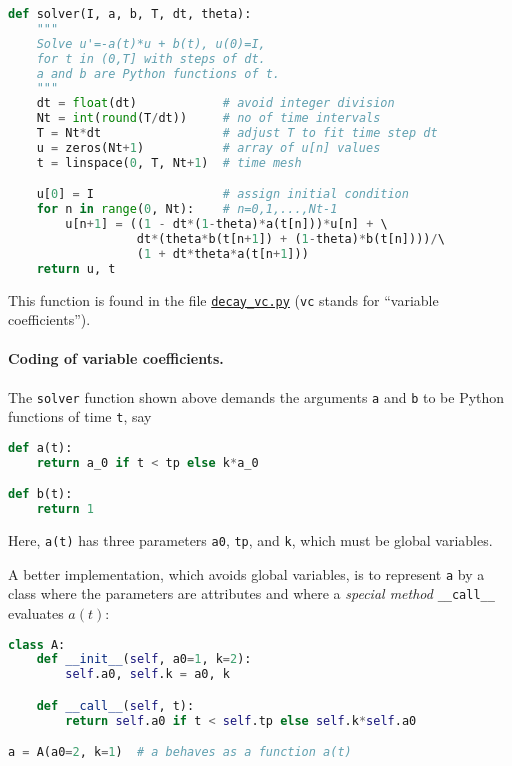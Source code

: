 \documentclass[graybox,sectrefs,envcountresetchap,open=right,final]{svmonodo}
\begin{document}
\begin{lstlisting}[language=Python,style=blue1_bluegreen]
def solver(I, a, b, T, dt, theta):
    """
    Solve u'=-a(t)*u + b(t), u(0)=I,
    for t in (0,T] with steps of dt.
    a and b are Python functions of t.
    """
    dt = float(dt)            # avoid integer division
    Nt = int(round(T/dt))     # no of time intervals
    T = Nt*dt                 # adjust T to fit time step dt
    u = zeros(Nt+1)           # array of u[n] values
    t = linspace(0, T, Nt+1)  # time mesh

    u[0] = I                  # assign initial condition
    for n in range(0, Nt):    # n=0,1,...,Nt-1
        u[n+1] = ((1 - dt*(1-theta)*a(t[n]))*u[n] + \ 
                  dt*(theta*b(t[n+1]) + (1-theta)*b(t[n])))/\ 
                  (1 + dt*theta*a(t[n+1]))
    return u, t
\end{lstlisting}
This function is found in the file \href{{http://tinyurl.com/ofkw6kc/genz/decay_vc.py}}{\nolinkurl{decay_vc.py}} (\texttt{vc} stands for ``variable coefficients'').

\paragraph{Coding of variable coefficients.}
The \texttt{solver} function shown above demands the arguments \texttt{a} and \texttt{b} to
be Python functions of time \texttt{t}, say

\begin{lstlisting}[language=Python,style=blue1_bluegreen]
def a(t):
    return a_0 if t < tp else k*a_0

def b(t):
    return 1
\end{lstlisting}
Here, \texttt{a(t)} has three parameters \texttt{a0}, \texttt{tp}, and \texttt{k},
which must be global variables.

A better implementation, which avoids global variables,
is to represent \texttt{a} by a class where the
parameters are attributes and where a \emph{special method} \Verb!__call__!
evaluates $a(t)$:

\begin{lstlisting}[language=Python,style=blue1_bluegreen]
class A:
    def __init__(self, a0=1, k=2):
        self.a0, self.k = a0, k

    def __call__(self, t):
        return self.a0 if t < self.tp else self.k*self.a0

a = A(a0=2, k=1)  # a behaves as a function a(t)
\end{lstlisting}
\end{document}
